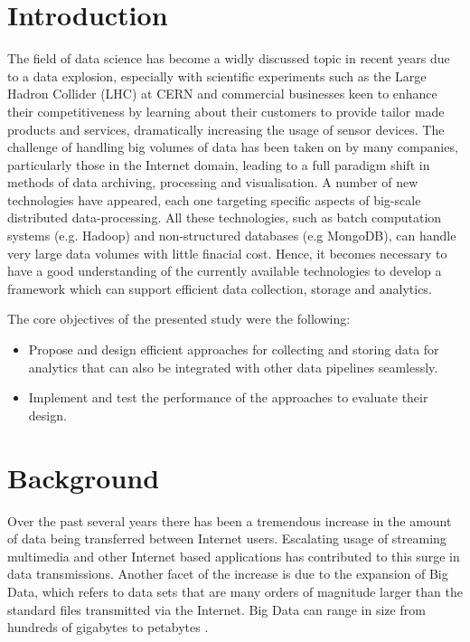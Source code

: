 \section{Introduction} \label{lbl-intro}
The field of data science has become a widly discussed topic in recent years due to a data explosion, especially with scientific experiments such as the Large Hadron Collider (LHC) at CERN and commercial businesses keen to enhance their competitiveness by learning about their customers to provide tailor made products and services, dramatically increasing the usage of sensor devices. The challenge of handling big volumes of data has been taken on by many companies, particularly those in the Internet domain, leading to a full paradigm shift in methods of data archiving, processing and visualisation. A number of new technologies have appeared, each one targeting specific aspects of big-scale distributed data-processing. All these technologies, such as batch computation systems (e.g. Hadoop) and non-structured databases (e.g MongoDB), can handle very large data volumes with little finacial cost. Hence, it becomes necessary to have a good understanding of the currently available technologies to develop a framework which can support efficient data collection, storage and analytics.

The core objectives of the presented study were the following:
\begin{itemize}
  \item Propose and design efficient approaches for collecting and storing data for analytics that can also be integrated with other data pipelines seamlessly.
  \item Implement and test the performance of the approaches to evaluate their design.
\end{itemize}

\section{Background} \label{lbl-review}
Over the past several years there has been a tremendous increase in the amount of data being transferred between Internet users. Escalating usage of streaming multimedia and other Internet based applications has contributed to this surge in data transmissions. Another facet of the increase is due to the expansion of Big Data, which refers to data sets that are many orders of magnitude larger than the standard files transmitted via the Internet. Big Data can range in size from hundreds of gigabytes to petabytes \cite{Verki1}.

